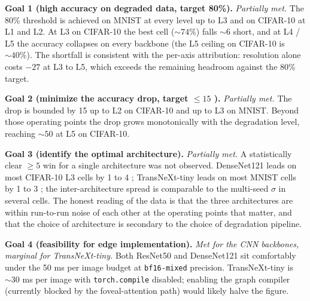 \textbf{Goal 1 (high accuracy on degraded data, target 80\%).}\quad
\emph{Partially met.} The 80\% threshold is achieved on MNIST at every
level up to L3 and on CIFAR-10 at L1 and L2. At L3 on CIFAR-10 the best
cell ($\sim 74\%$) falls $\sim 6$ \Mpp{} short, and at L4 / L5 the
accuracy collapses on every backbone (the L5 ceiling on CIFAR-10 is
$\sim 40\%$). The shortfall is consistent with the per-axis attribution:
resolution alone costs $-27$ \Mpp{} at L3 to L5, which exceeds the
remaining headroom against the 80\% target.

\textbf{Goal 2 (minimize the accuracy drop, target $\leq 15$ \Mpp{}).}\quad
\emph{Partially met.} The drop is bounded by 15 \Mpp{} up to L2 on
CIFAR-10 and up to L3 on MNIST. Beyond those operating points the drop
grows monotonically with the degradation level, reaching $\sim 50$
\Mpp{} at L5 on CIFAR-10.

\textbf{Goal 3 (identify the optimal architecture).}\quad
\emph{Partially met.} A statistically clear $\geq 5$ \Mpp{} win for a
single architecture was not observed. DenseNet121 leads on most
CIFAR-10 L3 cells by 1 to 4 \Mpp{}; TransNeXt-tiny leads on most MNIST
cells by 1 to 3 \Mpp{}; the inter-architecture spread is comparable to
the multi-seed $\sigma$ in several cells. The honest reading of the
data is that the three architectures are within run-to-run noise of
each other at the operating points that matter, and that the choice of
architecture is secondary to the choice of degradation pipeline.

\textbf{Goal 4 (feasibility for edge implementation).}\quad
\emph{Met for the CNN backbones, marginal for TransNeXt-tiny.} Both
ResNet50 and DenseNet121 sit comfortably under the 50 ms per image
budget at \texttt{bf16-mixed} precision. TransNeXt-tiny is $\sim 30$ ms
per image with \texttt{torch.compile} disabled; enabling the graph
compiler (currently blocked by the foveal-attention path) would
likely halve the figure.

